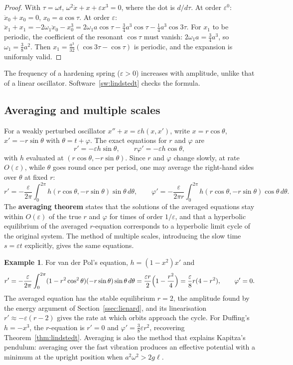\documentclass[11pt,a4paper]{article}
\numberwithin{equation}{section}
\theoremstyle{definition}
\newtheorem{exa}[thm]{Example}
\begin{document}
\begin{proof}
With $\tau = \omega t$, $\omega^2\ddot x + x + \varepsilon x^3 = 0$, where the dot is $d/d\tau$. At order $\varepsilon^0$: $\ddot x_0 + x_0 = 0$, $x_0 = a\cos\tau$. At order $\varepsilon$: $\ddot x_1 + x_1 = -2\omega_1\ddot x_0 - x_0^3 = 2\omega_1a\cos\tau - \frac34a^3\cos\tau - \frac14a^3\cos3\tau$.
For $x_1$ to be periodic, the coefficient of the resonant $\cos\tau$ must vanish: $2\omega_1a = \frac34a^3$, so $\omega_1 = \frac38a^2$. Then $x_1 = \frac{a^3}{32}(\cos3\tau - \cos\tau)$ is periodic, and the expansion is uniformly valid.
\end{proof}

The frequency of a hardening spring ($\varepsilon > 0$) increases with amplitude, unlike that of a linear oscillator. Software~\ref{sw:lindstedt} checks the formula.

\subsection{Averaging and multiple scales}
\label{ssec:averaging}

For a weakly perturbed oscillator $x'' + x = \varepsilon h(x, x')$, write $x = r\cos\theta$, $x' = -r\sin\theta$ with $\theta = t + \varphi$. The exact equations for $r$ and $\varphi$ are
\[
r' = -\varepsilon h\sin\theta, \qquad r\varphi' = -\varepsilon h\cos\theta ,
\]
with $h$ evaluated at $(r\cos\theta, -r\sin\theta)$. Since $r$ and $\varphi$ change slowly, at rate $O(\varepsilon)$, while $\theta$ goes round once per period, one may average the right-hand sides over $\theta$ at fixed $r$:
\[
r' = -\frac{\varepsilon}{2\pi}\int_0^{2\pi}h(r\cos\theta, -r\sin\theta)\sin\theta\,d\theta, \qquad \varphi' = -\frac{\varepsilon}{2\pi r}\int_0^{2\pi}h(r\cos\theta, -r\sin\theta)\cos\theta\,d\theta .
\]
The \textbf{averaging theorem} states that the solutions of the averaged equations stay within $O(\varepsilon)$ of the true $r$ and $\varphi$ for times of order $1/\varepsilon$, and that a hyperbolic equilibrium of the averaged
$r$-equation corresponds to a hyperbolic limit cycle of the original system. The method of multiple scales, introducing the slow time $s = \varepsilon t$ explicitly, gives the same equations.

\begin{exa}
\label{ex:avvdp}
For van der Pol's equation, $h = (1 - x^2)x'$ and
\[
r' = -\frac\varepsilon{2\pi}\int_0^{2\pi}(1 - r^2\cos^2\theta)(-r\sin\theta)\sin\theta\,d\theta = \frac{\varepsilon r}{2}\Bigl(1 - \frac{r^2}{4}\Bigr) = \frac\varepsilon8r(4 - r^2), \qquad \varphi' = 0 .
\]
The averaged equation has the stable equilibrium $r = 2$, the amplitude found by the energy argument of Section~\ref{ssec:lienard}, and its linearisation $r' \approx -\varepsilon(r - 2)$ gives the rate at which orbits approach the
cycle. For Duffing's $h = -x^3$, the $r$-equation is $r' = 0$ and $\varphi' = \frac38\varepsilon r^2$, recovering Theorem~\ref{thm:lindstedt}. Averaging is also the method that explains Kapitza's pendulum: averaging over the fast
vibration produces an effective potential with a minimum at the upright position when $a^2\omega^2 > 2g\ell$.
\end{exa}
\end{document}
